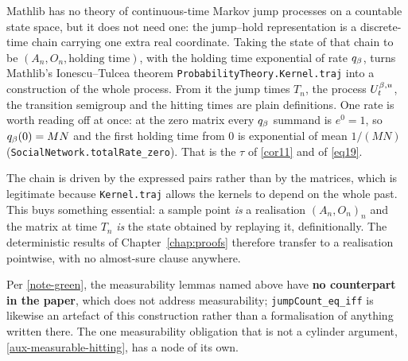 \begin{definition}
  \label{aux-construction}
  \leanok
  Mathlib has no theory of continuous-time Markov jump processes on a countable
  state space, but it does not need one: the jump--hold representation is a
  discrete-time chain carrying one extra real coordinate.  Taking the state of
  that chain to be $(A_n, O_n, \text{holding time})$, with the holding time
  exponential of rate $q_\beta$, turns Mathlib's Ionescu--Tulcea theorem
  \texttt{ProbabilityTheory.Kernel.traj} into a construction of the whole
  process.  From it the jump times $T_n$, the process $U^{\beta,u}_t$, the
  transition semigroup and the hitting times are plain definitions.  One rate is
  worth reading off at once: at the zero matrix every $q_\beta$ summand is
  $e^0 = 1$, so $q_\beta(0) = MN$ and the first holding time from $0$ is
  exponential of mean $1/(MN)$ (\texttt{SocialNetwork.totalRate\_zero}).  That
  is the $\tau$ of \ref{cor11} and of \ref{eq19}.

  The chain is driven by the expressed pairs rather than by the matrices, which
  is legitimate because \texttt{Kernel.traj} allows the kernels to depend on the
  whole past.  This buys something essential: a sample point \emph{is} a
  realisation $(A_n, O_n)_n$ and the matrix at time $T_n$ \emph{is} the state
  obtained by replaying it, definitionally.  The deterministic results of
  Chapter~\ref{chap:proofs} therefore transfer to a realisation pointwise, with
  no almost-sure clause anywhere.

  Per \ref{note-green}, the measurability lemmas named above have \textbf{no
  counterpart in the paper}, which does not address measurability;
  \texttt{jumpCount\_eq\_iff} is likewise an artefact of this construction
  rather than a formalisation of anything written there.  The one measurability
  obligation that is not a cylinder argument, \ref{aux-measurable-hitting}, has
  a node of its own.
\end{definition}

